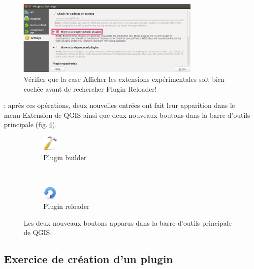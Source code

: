 \documentclass[11pt]{article}
\begin{document}
\begin{figure}[H]
	\centering
    \includegraphics[width=0.8\textwidth]{experimental_flag.png}
	\caption[Sélectionner \og{}Afficher les extensions expérimentales\fg{} pour trouver \og{}Plugin reloader\fg{}.]{Vérifier que la case \og{}Afficher les extensions expérimentales\fg{} soit bien cochée avant de rechercher \og{}Plugin Reloader\fg{}!}
    \label{experimental}
\end{figure}


\underline{}: après ces opérations, deux nouvelles entrées ont fait leur apparition dans le menu \og{}Extension\fg{} de QGIS ainsi que deux nouveaux boutons dans la barre d'outils principale (fig.\,\ref{fig3}).


\begin{figure}[H]
    \centering
    \begin{subfigure}[t]{0.2\textwidth}
		\centering
        \includegraphics[width=2em]{pluginbuilder.png}
\caption{Plugin builder}\label{fig3:builder}
    \end{subfigure}%
    ~
    \begin{subfigure}[t]{0.2\textwidth}
        \centering
        \includegraphics[width=2em]{reload.png}
        \caption{Plugin reloader}\label{fig3:reloader}
    \end{subfigure}
    \caption{Les deux nouveaux boutons apparus dans la barre d'outils principale de QGIS.}
    \label{fig3}
\end{figure}




\subsection{Exercice de création d'un plugin}
\label{CreationPlugin}
\end{document}
